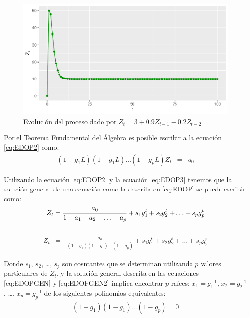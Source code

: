 \documentclass[
]{book}
\begin{document}
\begin{figure}

{\centering \includegraphics{Notas-Series-Tiempo_files/figure-latex/fig23-1} 

}

\caption{Evolución del proceso dado por $Z_t =3+0.9Z_{t-1}-0.2Z_{t-2}$}\label{fig:fig23}
\end{figure}

Por el Teorema Fundamental del Álgebra es posible escribir a la ecuación \eqref{eq:EDOP2} como:
\begin{eqnarray}
    (1 - g_1 L)(1 - g_1 L) \ldots (1 - g_p L) Z_t & = & a_0
    \label{eq:EDOP3}
\end{eqnarray}

Utilizando la ecuación \eqref{eq:EDOP2} y la ecuación \eqref{eq:EDOP3} tenemos que la solución general de una ecuación como la descrita en \eqref{eq:EDOP} se puede escribir como:
\begin{equation}
    Z_t  =  \frac{a_0}{1 - a_1 - a_2 - \ldots - a_p} + s_1 g^t_1 + s_2 g^t_2 + \ldots + s_p g^t_p \\
    \label{eq:EDOPGEN}
\end{equation}\\
\begin{eqnarray}
    Z_t & = & \frac{a_0}{(1 - g_1)(1 - g_1) \ldots (1 - g_p)} + s_1 g^t_1 + s_2 g^t_2 + \ldots + s_p g^t_p 
    \label{eq:EDOPGEN2}
\end{eqnarray}

Donde \(s_1\), \(s_2\), \ldots, \(s_p\) son cosntantes que se determinan utilizando \(p\) valores partículares de \(Z_t\), y la solución general descrita en las ecuaciones \eqref{eq:EDOPGEN} y \eqref{eq:EDOPGEN2} implica encontrar \(p\) raíces: \(x_1 = g^{-1}_1\), \(x_2 = g^{-1}_2\), \ldots, \(x_p = g^{-1}_p\) de los siguientes polinomios equivalentes:
\begin{eqnarray}
    (1 - g_1)(1 - g_1) \ldots (1 - g_p) = 0
    \label{eq:POLGEN1}
\end{eqnarray}
\end{document}
